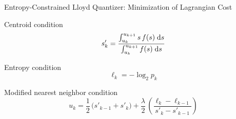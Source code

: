 

\begin{frame}{Entropy-Constrained Lloyd Quantizer: Minimization of Lagrangian Cost}
\ben
\item Centroid condition
  $$
s'_k
     =
     \frac{\int_{u_k}^{u_{k+1}}s\, f(s)\;\mathrm{d} s}
 	     {\int_{u_k}^{u_{k+1}}f(s)\;\mathrm{d} s}
  $$
\item Entropy condition
  $$
    \ell_k=-\log_2p_k
  $$
\item Modified nearest neighbor condition
  $$
u_k = \frac{1}{2}\,\big(s'_{k-1}+s'_k)+
        \frac{\lambda}{2}\,\left(\frac{\ell_k-\ell_{k-1}}{s'_k-s'_{k-1}}\right)
  $$
\een
{}\vspace{-5ex}
\end{frame}
